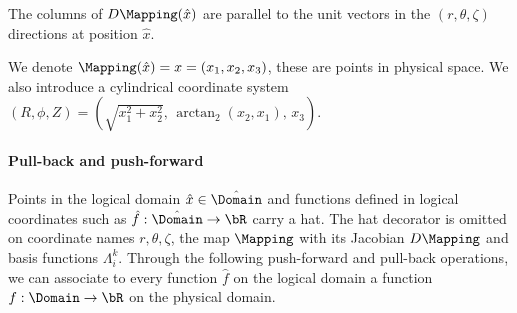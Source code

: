 \documentclass[%
 reprint,
 superscriptaddress,
 amsmath,amssymb,
 aps, nofootinbib, floatfix]{revtex4-2}
\begin{document}
The columns of $D\Mapping(\hat x)$ are parallel to the unit vectors in the $(r, \theta, \zeta)$ directions at position $\hat x$.

We denote $\Mapping(\hat x) = x = (x_1, x_2, x_3)$, these are points in physical space. We also introduce a cylindrical coordinate system $(R, \phi, Z) = (\sqrt{x_1^2 + x_2^2}, \, \arctan_2(x_2, x_1), \, x_3)$. 

\paragraph{Pull-back and push-forward}
Points in the logical domain $\hat x \in \hat \Domain$ and functions defined in logical coordinates such as $\hat f: \hat \Domain \to \bR$ carry a hat. The hat decorator is omitted on coordinate names $r, \theta, \zeta$, the map $\Mapping$ with its Jacobian $D\Mapping$ and basis functions $\Lambda^k_i$. 
Through the following push-forward and pull-back operations, we can associate to every function $\hat f$ on the logical domain a function $f: \Domain \to \bR$ on the physical domain.
\end{document}
